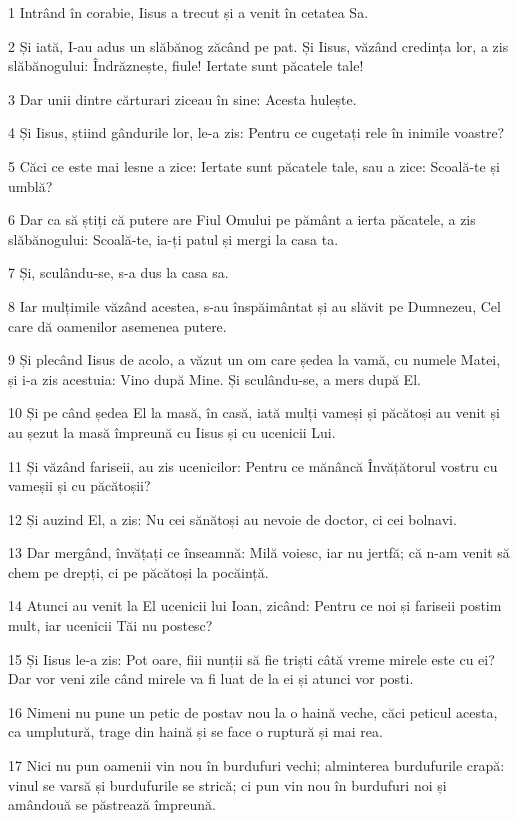 \par 1 Intrând în corabie, Iisus a trecut și a venit în cetatea Sa.
\par 2 Și iată, I-au adus un slăbănog zăcând pe pat. Și Iisus, văzând credința lor, a zis slăbănogului: Îndrăznește, fiule! Iertate sunt păcatele tale!
\par 3 Dar unii dintre cărturari ziceau în sine: Acesta hulește.
\par 4 Și Iisus, știind gândurile lor, le-a zis: Pentru ce cugetați rele în inimile voastre?
\par 5 Căci ce este mai lesne a zice: Iertate sunt păcatele tale, sau a zice: Scoală-te și umblă?
\par 6 Dar ca să știți că putere are Fiul Omului pe pământ a ierta păcatele, a zis slăbănogului: Scoală-te, ia-ți patul și mergi la casa ta.
\par 7 Și, sculându-se, s-a dus la casa sa.
\par 8 Iar mulțimile văzând acestea, s-au înspăimântat și au slăvit pe Dumnezeu, Cel care dă oamenilor asemenea putere.
\par 9 Și plecând Iisus de acolo, a văzut un om care ședea la vamă, cu numele Matei, și i-a zis acestuia: Vino după Mine. Și sculându-se, a mers după El.
\par 10 Și pe când ședea El la masă, în casă, iată mulți vameși și păcătoși au venit și au șezut la masă împreună cu Iisus și cu ucenicii Lui.
\par 11 Și văzând fariseii, au zis ucenicilor: Pentru ce mănâncă Învățătorul vostru cu vameșii și cu păcătoșii?
\par 12 Și auzind El, a zis: Nu cei sănătoși au nevoie de doctor, ci cei bolnavi.
\par 13 Dar mergând, învățați ce înseamnă: Milă voiesc, iar nu jertfă; că n-am venit să chem pe drepți, ci pe păcătoși la pocăință.
\par 14 Atunci au venit la El ucenicii lui Ioan, zicând: Pentru ce noi și fariseii postim mult, iar ucenicii Tăi nu postesc?
\par 15 Și Iisus le-a zis: Pot oare, fiii nunții să fie triști câtă vreme mirele este cu ei? Dar vor veni zile când mirele va fi luat de la ei și atunci vor posti.
\par 16 Nimeni nu pune un petic de postav nou la o haină veche, căci peticul acesta, ca umplutură, trage din haină și se face o ruptură și mai rea.
\par 17 Nici nu pun oamenii vin nou în burdufuri vechi; alminterea burdufurile crapă: vinul se varsă și burdufurile se strică; ci pun vin nou în burdufuri noi și amândouă se păstrează împreună.
